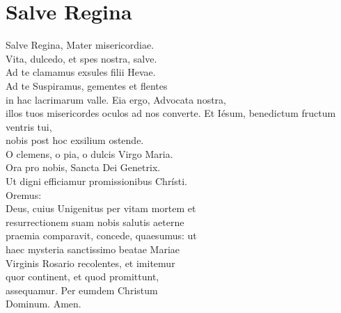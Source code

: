 \documentclass[paper=a5,pagesize=pdftex,fontsize=10pt,headinclude=on,twoside=off]{scrbook}
\begin{document}
\section{Salve Regina}
\begin{scripture}
  \begin{poetry}
    Salve Regina, Mater misericordiae.\\
    Vita, dulcedo, et spes nostra, salve.\\
    Ad te clamamus exsules filii Hevae.\\
    Ad te Suspiramus, gementes et flentes\\
    in hac lacrimarum valle.
    Eia ergo, Advocata nostra, \\
    illos tuos misericordes oculos ad nos converte.
    Et Iésum, benedictum fructum ventris tui, \\
    nobis post hoc exsilium ostende.\\
    O clemens, o pia, o dulcis Virgo Maria.\\
    Ora pro nobis, Sancta Dei Genetrix.\\
    Ut digni efficiamur promissionibus Chrísti.\\
    Oremus:\\
    Deus, cuius Unigenitus per vitam mortem et\\
    resurrectionem suam nobis salutis aeterne\\
    praemia comparavit, concede, quaesumus: ut\\
    haec mysteria sanctissimo beatae Mariae\\
    Virginis Rosario recolentes, et imitemur\\
    quor continent, et quod promittunt,\\
    assequamur. Per eumdem Christum\\
    Dominum. Amen.\\
  \end{poetry}
\end{scripture}
\end{document}
